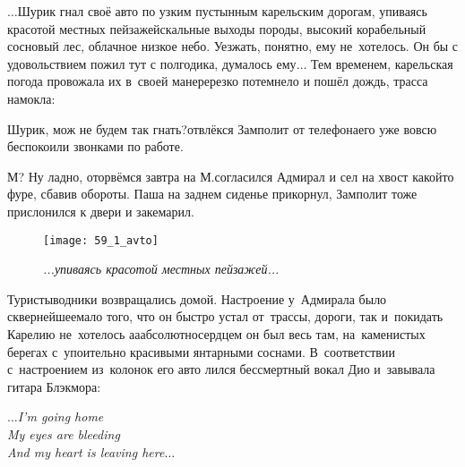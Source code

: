 
$\ldots$Шурик гнал своё авто по узким пустынным карельским дорогам, упиваясь красотой местных пейзажей\mdash скальные выходы породы, высокий корабельный сосновый лес, облачное низкое небо. Уезжать, понятно, ему не~хотелось. Он бы с удовольствием пожил тут с полгодика, думалось ему$\ldots$ Тем временем, карельская погода провожала их в~своей манере\mdash резко потемнело и пошёл дождь, трасса намокла:

{
\diagdash Шурик, мож не будем так гнать?\mdash отвлёкся Замполит от телефона\mdash его уже вовсю беспокоили звонками по работе.

\diagdash М? Ну ладно, оторвёмся завтра на М.\mdash согласился Адмирал и сел на хвост какой\sdash то фуре, сбавив обороты. Паша на заднем сиденье прикорнул, Замполит тоже прислонился к двери и закемарил.
}

\newpage

\begin{figure}[h]
	\centering
	\texttt{[image: 59\_1\_avto]}
	\caption{\small\textit{...упиваясь красотой местных пейзажей...}}
\end{figure}
Туристы\sdash водники возвращались домой. Настроение у~Адмирала было сквернейшее\mdash мало того, что он быстро устал от~трассы, дороги, так и~покидать Карелию не~хотелось а\sdash а\sdash абсолютно\mdash сердцем он был весь там, на~каменистых берегах с~упоительно красивыми янтарными соснами. В~соответствии с~настроением из~колонок его авто лился бессмертный вокал Дио и~завывала гитара Блэкмора:

\vspace{1.0cm}
\noindent\textit{%
	\hspace*{3.4cm}$\ldots$I'm going home\\
	\hspace*{3.4cm}My eyes are bleeding\\
	\hspace*{3.4cm}And my heart is leaving here$\ldots$%
}

